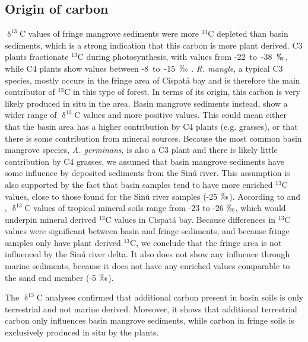 \subsection{Origin of carbon}
$\updelta^{13}$C values of fringe mangrove sediments were more $^{13}$C depleted than basin sediments, which is a strong indication that this carbon is more plant derived. C3 plants fractionate $^{13}$C during photosynthesis, with values from \mbox{-22 to -38 $\permil$}, while C4 plants show values between \mbox{-8 to -15 $\permil$} \citep{Farquhar1989}. \textit{R. mangle}, a typical C3 species, mostly occurs in the fringe area of Cispat\'{a} bay \citep{Bolivar2015} and is therefore the main contributor of $^{13}$C in this type of forest. In terms of its origin, this carbon is very likely produced in situ in the area. Basin mangrove sediments instead, show a wider range of $\updelta^{13}$C values and more positive values. This could mean either that the basin area has a higher contribution by C4 plants (e.g. grasses), or that there is some contribution from mineral sources. Because the most common basin mangrove species, \textit{A. germinans}, is also a C3 plant and there is likely little contribution by C4 grasses, we assumed that basin mangrove sediments have some influence by deposited sediments from the Sin\'{u} river. This assumption is also supported by the fact that basin samples tend to have more enriched $^{13}$C values, close to those found for the Sin\'{u} river samples (-25 $\permil$). According to \citet{ruttenberg1997} and \citet{powers2005}, $\updelta^{13}$C values of tropical mineral soils range from -23 to -26 $\permil$, which would underpin mineral derived $^{13}$C values in Cispat\'{a} bay. Because differences in $^{13}$C values were significant between basin and fringe sediments, and because fringe samples only have plant derived $^{13}$C, we conclude that the fringe area is not influenced by the Sin\'{u} river delta. It also does not show any influence through marine sediments, because it does not have any enriched values comparable to the sand end member (-5 $\permil$). 

The $\updelta^{13}$C analyses confirmed that additional carbon present in basin soils is only terrestrial and not marine derived. Moreover, it shows that additional terrestrial carbon only influences basin mangrove sediments, while carbon in fringe soils is exclusively produced in situ by the plants.\par

